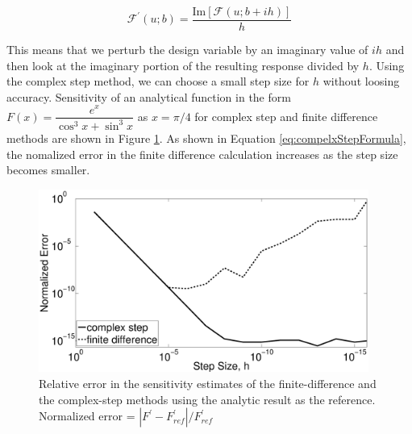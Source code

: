 \documentclass[12pt]{aiaa-pretty}
\begin{document}
%
\begin{equation}\label{eq:compelxStepFormula}
	\mathcal{F}^\prime\left(u; b\right) = \frac{\text{Im}\left[ \mathcal{F}\left(u; b + ih\right) \right]}{h}
\end{equation}
%

This means that we perturb the design variable by an imaginary value of $ih$ and then look at the imaginary portion of the resulting response divided by $h$. Using the complex step method, we can choose a small step size for $h$ without loosing accuracy. Sensitivity of an analytical function in the form $F(x) = \dfrac{e^x}{\cos^3 x + \sin^3 x}$ as $x = \pi/4$ for complex step and finite difference methods are shown in Figure \ref{fig:CSvsFD}. As shown in Equation \eqref{eq:compelxStepFormula}, the nomalized error in the finite difference calculation increases as the step size becomes smaller.

%
\begin{figure}[H]
	\centering
	\includegraphics[height=6.0cm]{figure/FDvsCS.eps}
	\caption{Relative error in the sensitivity estimates of the finite-difference and the complex-step methods using the analytic result as the reference. Normalized error = $\left| F^\prime - F^\prime_{ref} \right| / F^\prime_{ref}$}
	\label{fig:CSvsFD}
\end{figure}
%

\end{document}
